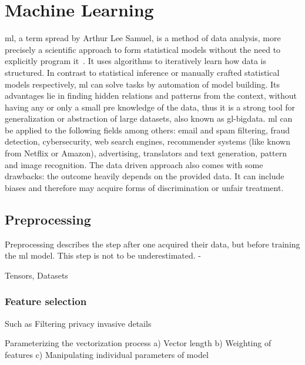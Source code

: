 

\section{Machine Learning}
\label{sec:machine-learning}

\gls{ml}, a term spread by Arthur Lee Samuel, is a method of data analysis, more precisely a scientific approach to form statistical models without the need to explicitly program it~\cite{mahesh2020machine}.
It uses algorithms to iteratively learn how data is structured.
In contrast to statistical inference or manually crafted statistical models respectively, \gls{ml} can solve tasks by automation of model building.
Its advantages lie in finding hidden relations and patterns from the context, without having any or only a small pre knowledge of the data, thus it is a strong tool for generalization or abstraction of large datasets, also known as \gls{gl-bigdata}.
\gls{ml} can be applied to the following fields among others: email and spam filtering, fraud detection, cybersecurity, web search engines, recommender systems (like known from Netflix or Amazon), advertising, translators and text generation, pattern and image recognition.
The data driven approach also comes with some drawbacks: the outcome heavily depends on the provided data.
It can include biases and therefore may acquire forms of discrimination or unfair treatment.


\subsection{Preprocessing}

Preprocessing describes the step after one acquired their data, but before training the \gls{ml} model.
This step is not to be underestimated.
-


Tensors, Datasets

\subsubsection{Feature selection}
Such as Filtering privacy invasive details

Parameterizing the vectorization process
a) Vector length
b) Weighting of features
c) Manipulating individual parameters of model

